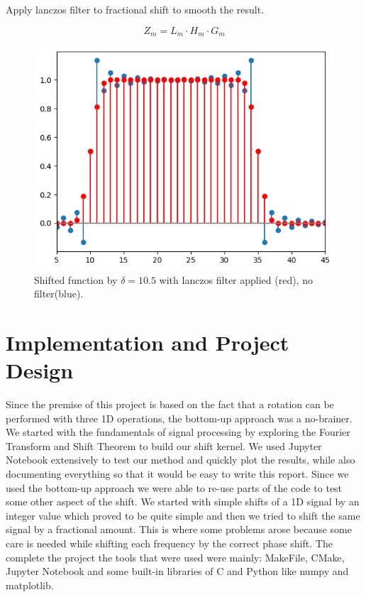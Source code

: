 \documentclass[]{usiinfbachelorproject}
\begin{document}
	Apply lanczos filter to fractional shift to smooth the result.
	
	\begin{equation*}
		Z_m = L_m \cdot H_m \cdot G_m
	\end{equation*}
	
	\begin{figure}[h]
		\centering
		\includegraphics[width=0.5\columnwidth]{images/box_shifted_lanczos_delta10_1_n50.png}
		\caption{Shifted function by $\delta=10.5$ with lanczos filter applied (red), no filter(blue).}
	\end{figure}
	
	\fi
	
	\newpage
	
	\section{Implementation and Project Design}
		Since the premise of this project is based on the fact that a rotation can be performed with three 1D operations, the bottom-up approach was a no-brainer. We started with the fundamentals of signal processing by exploring the Fourier Transform and Shift Theorem to build our shift kernel. We used Jupyter Notebook extensively to test our method and quickly plot the results, while also documenting everything so that it would be easy to write this report. Since we used the bottom-up approach we were able to re-use parts of the code to test some other aspect of the shift. We started with simple shifts of a 1D signal by an integer value which proved to be quite simple and then we tried to shift the same signal by a fractional amount. This is where some problems arose because some care is needed while shifting each frequency by the correct phase shift.
		The complete the project the tools that were used were mainly: MakeFile, CMake, Jupyter Notebook and some built-in libraries of C and Python like numpy and matplotlib.
		
\end{document}
